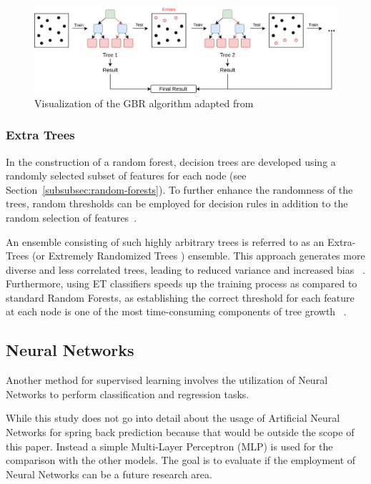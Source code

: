 \begin{figure}[h]
    \begin{tcolorbox}[arc=0pt,boxrule=0.5pt]
        \centering
        \includegraphics[width=1\textwidth]{chap4/images/gradient_boosting_example}
    \end{tcolorbox}
    \caption{Visualization of the \ac{GBR} algorithm adapted from~\cite[p. 222]{boehmke2019hands}}
    \label{fig:gbr-example}
\end{figure}

\subsubsection{Extra Trees}\label{subsubsec:extra-trees}
In the construction of a random forest, decision trees are developed using a randomly selected subset of features for
each node (see Section~\ref{subsubsec:random-forests}). To further enhance the randomness of the trees, random
thresholds can be employed for decision rules in addition to the random selection of
features~\cite[p. 351]{geron2022hands}.

An ensemble consisting of such highly arbitrary trees is referred to as an Extra-Trees (or Extremely Randomized Trees
) ensemble.
This approach generates more diverse and less correlated trees, leading to reduced variance and increased
bias
~\cite[p. 351]{geron2022hands}.
Furthermore, using ET classifiers speeds up the training process as compared to standard Random Forests, as
establishing the correct threshold for each feature at each node is one of the most time-consuming components of tree
growth
~\cite[p. 351]{geron2022hands}.

\subsection{Neural Networks}\label{subsec:neural-networks}
Another method for supervised learning involves the utilization of Neural Networks to
perform classification and regression tasks.

While this study does not go into detail about the usage of Artificial Neural Networks for spring back prediction
because that would be outside the scope of this paper.
Instead a simple Multi-Layer Perceptron (MLP) is used for the comparison with the other models. The goal is to
evaluate if the employment of Neural Networks can be a future research area.

